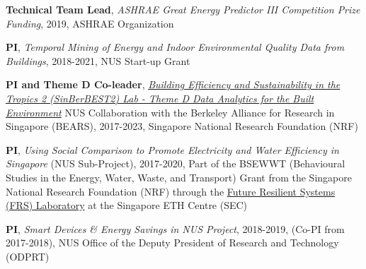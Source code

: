 \documentclass[10pt,a4paper]{article}
\begin{document}
\begin{small}
\begin{etaremune}
  \item \textbf{Technical Team Lead}, \emph{ASHRAE Great Energy Predictor III Competition Prize Funding}, 2019, ASHRAE Organization%

  \item \textbf{PI}, \emph{Temporal Mining of Energy and Indoor Environmental Quality Data from Buildings}, 2018-2021, NUS Start-up Grant%

  \item \textbf{PI and Theme D Co-leader}, \emph{\href{https://bear.create.edu.sg/about-create/research-centres/bears/}{Building Efficiency and Sustainability in the Tropics 2 (SinBerBEST2) Lab - Theme D Data Analytics for the Built Environment}} NUS Collaboration with the Berkeley Alliance for Research in Singapore (BEARS), 2017-2023, Singapore National Research Foundation (NRF)%

  \item \textbf{PI}, \emph{Using Social Comparison to Promote Electricity and Water Efficiency in Singapore} (NUS Sub-Project), 2017-2020, Part of the BSEWWT (Behavioural Studies in the Energy, Water, Waste, and Transport) Grant from the Singapore National Research Foundation (NRF) through the \href{https://sec.ethz.ch/research/frs.html}{Future Resilient Systems (FRS) Laboratory} at the Singapore ETH Centre (SEC)%

  \item \textbf{PI}, \emph{Smart Devices \& Energy Savings in NUS Project}, 2018-2019, (Co-PI from 2017-2018), NUS Office of the Deputy President of Research and Technology (ODPRT)%

  \end{etaremune}




\end{small}
\end{document}
